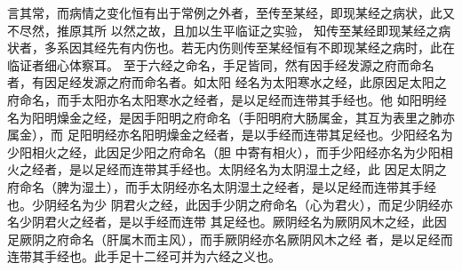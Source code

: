 \documentclass[a4paper,12pt,UTF8,twoside]{ctexbook}
\begin{document}
言其常，而病情之变化恒有出于常例之外者，至传至某经，即现某经之病状，此又不尽然，推原其所 
以然之故，且加以生平临证之实验， 
知传至某经即现某经之病状者，多系因其经先有内伤也。若无内伤则传至某经恒有不即现某经之病时，此在 
临证者细心体察耳。 
至于六经之命名，手足皆同，然有因手经发源之府而命名者，有因足经发源之府而命名者。如太阳 
经名为太阳寒水之经，此原因足太阳之府命名，而手太阳亦名太阳寒水之经者，是以足经而连带其手经也。他 
如阳明经名为阳明燥金之经，是因手阳明之府命名（手阳明府大肠属金，其互为表里之肺亦属金），而 
足阳明经亦名阳明燥金之经者，是以手经而连带其足经也。少阳经名为少阳相火之经，此因足少阳之府命名（胆 
中寄有相火），而手少阳经亦名为少阳相火之经者，是以足经而连带其手经也。太阴经名为太阴湿土之经，此 
因足太阴之府命名（脾为湿土），而手太阴经亦名太阴湿土之经者，是以足经而连带其手经也。少阴经名为少 
阴君火之经，此因手少阴之府命名（心为君火），而足少阴经亦名少阴君火之经者，是以手经而连带 
其足经也。厥阴经名为厥阴风木之经，此因足厥阴之府命名（肝属木而主风），而手厥阴经亦名厥阴风木之经 
者，是以足经而连带其手经也。此手足十二经可并为六经之义也。 
\end{document}
